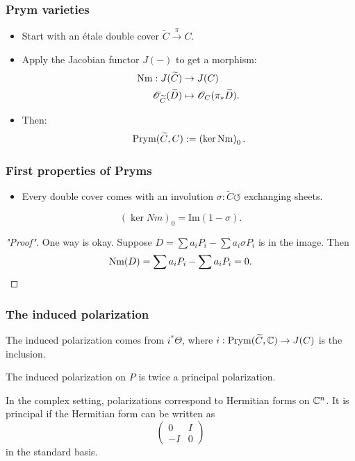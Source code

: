\begin{frame}
\frametitle{Prym varieties}


\begin{itemize}
	\item Start with an étale double cover \alert{$\widetilde C \xrightarrow{\pi} C$}.
	\pause
	\item Apply the Jacobian functor $J(-)$ to get a morphism:
	\begin{align*}
	\operatorname{Nm}:J(\widetilde C) &\to J(C) \\
	\mathscr{O}_{\widetilde C}(\widetilde D) &\mapsto \mathscr{O}_C(\pi_\ast \widetilde D).
	\end{align*}
	\pause

	\item Then:
	\alert{
	\[
	\operatorname{Prym}(\widetilde C, C) := \left(\ker \operatorname{Nm} \right)_0.
	\]
	}
\end{itemize}

\end{frame}


\begin{frame}
\frametitle{First properties of Pryms}

\begin{itemize}
	\item Every double cover comes with an involution $\sigma:  \widetilde C \circlearrowleft$ exchanging sheets.
\end{itemize}


\begin{proposition}
\[
(\ker Nm)_0 = \mathrm{Im}(1-\sigma).
\]
\end{proposition}
\begin{proof}["Proof"]
One way is okay. Suppose $D= \sum a_i P_i - \sum a_i \sigma{P_i}$ is in the image. Then
\[
\operatorname{Nm}(D) = \sum a_i P_i - \sum a_i P_i = 0.
\]
\end{proof}
\end{frame}

\begin{frame}
\frametitle{The induced polarization}

The induced polarization comes from \alert{$i^\ast \Theta$}, where $i:\operatorname{Prym}(\widetilde C, \mathbb{C}) \to J(C)$ is the inclusion.

\begin{theorem}
The induced polarization on $P$ is twice a principal polarization.
\end{theorem}
\pause
\begin{remark}
In the complex setting, polarizations correspond to Hermitian forms on $\mathbb{C}^n$. It is principal if the Hermitian form can be written as 
\[
\begin{pmatrix}
0 & I \\
-I &0
\end{pmatrix}
\]
in the standard basis.
\end{remark}
\end{frame}

